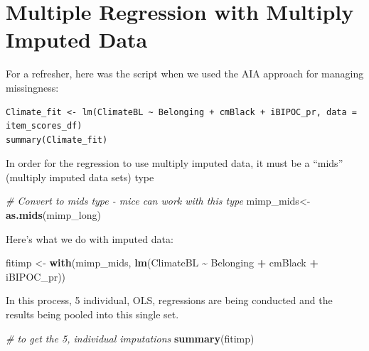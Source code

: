 \documentclass[
  11pt,
]{book}
\newenvironment{Shaded}{\begin{snugshade}}{\end{snugshade}}
\newcommand{\CommentTok}[1]{\textcolor[rgb]{0.37,0.37,0.37}{\textit{#1}}}
\newcommand{\FunctionTok}[1]{\textcolor[rgb]{0.27,0.27,0.27}{\textbf{#1}}}
\newcommand{\NormalTok}[1]{#1}
\newcommand{\OtherTok}[1]{\textcolor[rgb]{0.37,0.37,0.37}{#1}}
\newcommand{\SpecialCharTok}[1]{\textcolor[rgb]{0.43,0.43,0.43}{\textbf{#1}}}
\begin{document}
\hypertarget{multiple-regression-with-multiply-imputed-data}{%
\section{Multiple Regression with Multiply Imputed Data}\label{multiple-regression-with-multiply-imputed-data}}

For a refresher, here was the script when we used the AIA approach for managing missingness:

\begin{verbatim}
Climate_fit <- lm(ClimateBL ~ Belonging + cmBlack + iBIPOC_pr, data = item_scores_df)
summary(Climate_fit)
\end{verbatim}

In order for the regression to use multiply imputed data, it must be a ``mids'' (multiply imputed data sets) type

\begin{Shaded}
\begin{Highlighting}[]
\CommentTok{\# Convert to mids type {-} mice can work with this type}
\NormalTok{mimp\_mids}\OtherTok{\textless{}{-}}\FunctionTok{as.mids}\NormalTok{(mimp\_long)}
\end{Highlighting}
\end{Shaded}

Here's what we do with imputed data:

\begin{Shaded}
\begin{Highlighting}[]
\NormalTok{fitimp }\OtherTok{\textless{}{-}} \FunctionTok{with}\NormalTok{(mimp\_mids,}
               \FunctionTok{lm}\NormalTok{(ClimateBL }\SpecialCharTok{\textasciitilde{}}\NormalTok{ Belonging }\SpecialCharTok{+}\NormalTok{ cmBlack }\SpecialCharTok{+}\NormalTok{ iBIPOC\_pr))}
\end{Highlighting}
\end{Shaded}

In this process, 5 individual, OLS, regressions are being conducted and the results being pooled into this single set.

\begin{Shaded}
\begin{Highlighting}[]
\CommentTok{\# to get the 5, individual imputations}
\FunctionTok{summary}\NormalTok{(fitimp)}
\end{Highlighting}
\end{Shaded}
\end{document}
